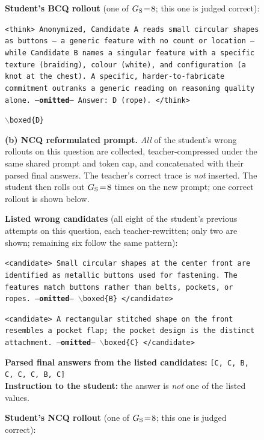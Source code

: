\documentclass{llmxive}
\begin{document}
\begin{figure}[!p]
\begin{prompttemplatefig}
\textbf{Student's BCQ rollout} (one of $G_{\rm S}\!=\!8$; this one is judged correct):

\smallskip
\texttt{<think> Anonymized, Candidate~A reads small circular shapes as buttons -- a generic feature with no count or location -- while Candidate~B names a singular feature with a specific texture (braiding), colour (white), and configuration (a knot at the chest). A specific, harder-to-fabricate commitment outranks a generic reading on reasoning quality alone. ---\textbf{omitted}--- Answer: D (rope). </think>}

\smallskip
\texttt{$\backslash$boxed\{D\}} \quad \checkmark
\end{prompttemplatefig}

\vspace{1pt}\noindent\textbf{(b) NCQ reformulated prompt.} \emph{All} of the student's wrong rollouts on this question are collected, teacher-compressed under the same shared prompt and token cap, and concatenated with their parsed final answers. The teacher's correct trace is \emph{not} inserted. The student then rolls out $G_{\rm S}\!=\!8$ times on the new prompt; one correct rollout is shown below.

\begin{negcandidatebox}
\textbf{Listed wrong candidates} (all eight of the student's previous attempts on this question, each teacher-rewritten; only two are shown; remaining six follow the same pattern):

\smallskip
\texttt{<candidate> Small circular shapes at the center front are identified as metallic buttons used for fastening. The features match buttons rather than belts, pockets, or ropes. ---\textbf{omitted}--- $\backslash$boxed\{B\} </candidate>}

\smallskip
\texttt{<candidate> A rectangular stitched shape on the front resembles a pocket flap; the pocket design is the distinct attachment. ---\textbf{omitted}--- $\backslash$boxed\{C\} </candidate>}

\smallskip
\textbf{Parsed final answers from the listed candidates:} \texttt{[C, C, B, C, C, C, B, C]} \\
\textbf{Instruction to the student:} the answer is \emph{not} one of the listed values.
\end{negcandidatebox}

\begin{prompttemplatefig}
\textbf{Student's NCQ rollout} (one of $G_{\rm S}\!=\!8$; this one is judged correct):


\end{prompttemplatefig}
\end{figure}
\end{document}
